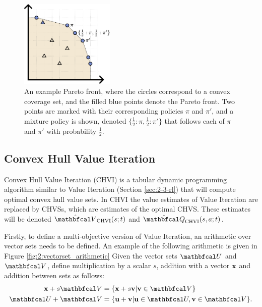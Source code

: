     \begin{figure}
        \centering\includegraphics[width=0.4\textwidth]{figures/ch2/pf_geometry.pdf} 
        \caption[An example Pareto front.]{An example Pareto front, where the circles correspond to a convex coverage set, and the filled blue points denote the Pareto front. Two points are marked with their corresponding policies $\pi$ and $\pi'$, and a mixture policy is shown, denoted $\{\frac{1}{2}:\pi, \frac{1}{2}:\pi'\}$ that follows each of $\pi$ and $\pi'$ with probability $\frac{1}{2}$.}
        \label{fig:2:pareto_front} 
    \end{figure}




    \subsection{Convex Hull Value Iteration}
    \label{sec:2-5-1-chvi}


        Convex Hull Value Iteration (CHVI) \cite{chvi} is a tabular dynamic programming algorithm similar to Value Iteration (Section \ref{sec:2-3-rl}) that will compute optimal convex hull value sets. In CHVI the value estimates of Value Iteration are replaced by CHVSs, which are estimates of the optimal CHVS. These estimates will be denoted $\Vchvi(s;t)$ and $\Qchvi(s,a;t)$.

        Firstly, to define a multi-objective version of Value Iteration, an arithmetic over vector sets needs to be defined. An example of the following arithmetic is given in Figure \ref{fig:2:vectorset_arithmetic} Given the vector sets $\bfcl{U}$ and $\bfcl{V}$, define multiplication by a scalar $s$, addition with a vector $\mathbf{x}$ and addition between sets as follows:
        \begin{align}
            \bff{x} + s\bfcl{V} &= \{\bff{x} + s\bff{v} | \bff{v}\in\bfcl{V} \} \label{eq:2:vector_set_arithmetic_one} \\
            \bfcl{U} + \bfcl{V} &= \{ \bff{u}+\bff{v} | \bff{u}\in\bfcl{U}, \bff{v}\in\bfcl{V} \}. \label{eq:2:vector_set_arithmetic_two} 
        \end{align}

